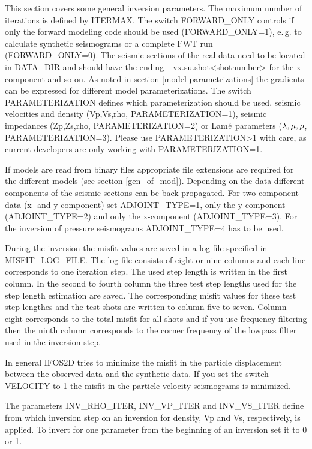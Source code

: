 This section covers some general inversion parameters. The maximum number of iterations is defined by ITERMAX. The switch FORWARD\_ONLY controls if only the forward modeling code should be used (FORWARD\_ONLY=1), e.\,g. to calculate synthetic seismograms or a complete FWT run (FORWARD\_ONLY=0). The seismic sections of the real data need to be located in DATA\_DIR and should have the ending \_vx.su.shot<shotnumber> for the x-component and so on. As noted in section \ref{model parametrizations} the gradients can be expressed for different model parameterizations. The switch PARAMETERIZATION defines which parameterization should be used, seismic velocities and density (Vp,Vs,rho, PARAMETERIZATION=1), seismic impedances (Zp,Zs,rho, PARAMETERIZATION=2) or Lam$\rm{\acute{e}}$ parameters ($\rm{\lambda,\mu,\rho}$, PARAMETERIZATION=3). Please use PARAMETERIZATION>1 with care, as current developers are only working with PARAMETERIZATION=1.

If models are read from binary files appropriate file extensions are required for the different models (see section \ref{gen_of_mod}). Depending on the data different components of the seismic sections can be back propagated. For two component data (x- and y-component) set ADJOINT\_TYPE=1, only the y-component (ADJOINT\_TYPE=2) and only the x-component (ADJOINT\_TYPE=3). For the inversion of pressure seismograms ADJOINT\_TYPE=4 has to be used.

During the inversion the misfit values are saved in a log file specified in MISFIT\_LOG\_FILE. The log file consists of eight or nine columns and each line corresponds to one iteration step. The used step length is written in the first column. In the second to fourth column the three test step lengths used for the step length estimation are saved. The corresponding misfit values for these test step lengthes and the test shots are written to column five to seven. Column eight corresponds to the total misfit for all shots and if you use frequency filtering then the ninth column corresponds to the corner frequency of the lowpass filter used in the inversion step.

In general IFOS2D tries to minimize the misfit in the particle displacement between the observed data and the synthetic data. If you set the switch VELOCITY to 1 the misfit in the particle velocity seismograms is minimized.

The parameters INV\_RHO\_ITER, INV\_VP\_ITER and INV\_VS\_ITER define from which inversion step on an inversion for density, Vp and Vs, respectively, is applied. To invert for one parameter from the beginning of an inversion set it to 0 or 1.


